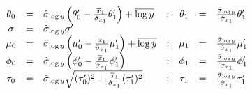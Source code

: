 \documentclass[varwidth=\linewidth]{standalone}
\begin{document}
$$\begin{matrix}
\theta_0 &=& \hat{\sigma}_{\log y} \left( \theta_0' -
                                          \frac{\overline{x}_1}
                                               {\hat{\sigma}_{x_1}}
                                          \theta_1' \right) +
             \overline{\log y} 
\hfill{} &;&
\theta_1 &=& \frac{\hat{\sigma}_{\log y}}{\hat{\sigma}_{x_1}} \theta_1'
\hfill{} \\
\sigma   &=& \hat{\sigma}_{\log y} \sigma'
\hfill{} \\
\mu_0    &=& \hat{\sigma}_{\log y} \left( \mu_0' -
                                          \frac{\overline{x}_1}
                                               {\hat{\sigma}_{x_1}}
                                          \mu_1' \right) +
             \overline{\log y} 
\hfill{} &;&
\mu_1    &=& \frac{\hat{\sigma}_{\log y}}{\hat{\sigma}_{x_1}} \mu_1'
\hfill{} \\
\phi_0   &=& \hat{\sigma}_{\log y} \left( \phi_0' -
                                          \frac{\overline{x}_1}
                                               {\hat{\sigma}_{x_1}}
                                          \phi_1' \right) 
\hfill{} &;&
\phi_1   &=& \frac{\hat{\sigma}_{\log y}}{\hat{\sigma}_{x_1}} \phi_1'
\hfill{} \\
\tau_0   &=& \hat{\sigma}_{\log y} \sqrt{(\tau_0')^2 + \frac{\overline{x}_1}
                                                           {\hat{\sigma}_{x_1}} (\tau_1')^2 }
\hfill{} &;&
\tau_1   &=& \frac{\hat{\sigma}_{\log y}}{\hat{\sigma}_{x_1}} \tau_1'
\hfill{} \\
\end{matrix}$$
\end{document}
